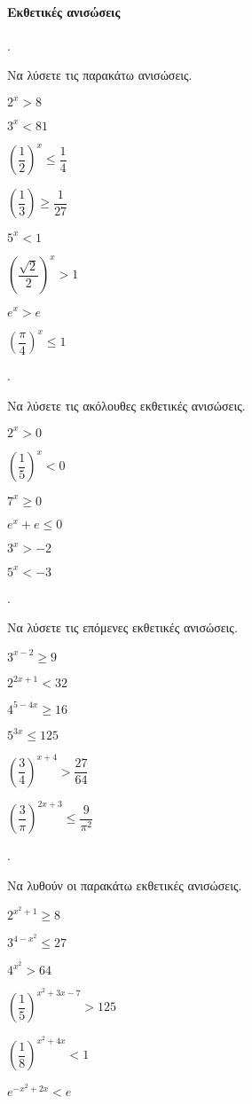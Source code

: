 \documentclass[11pt,a4paper,twocolumn]{article}
\newcounter{askhsh}
\newcommand{\askhsh}{\large\theaskhsh.\ \addtocounter{askhsh}{1}}
\begin{document}
\paragraph{Εκθετικές ανισώσεις}
\askhsh Να λύσετε τις παρακάτω ανισώσεις.
\begin{multicols}{2}
\begin{alist}
\item $2^x>8$
\item $3^x<81$
\item $\left(\dfrac{1}{2}\right)^x\leq\dfrac{1}{4}$
\item $\left(\dfrac{1}{3}\right)\geq\dfrac{1}{27}$
\item $5^x<1$
\item $\left(\dfrac{\sqrt{2}}{2}\right)^x>1$
\item $e^x>e$
\item $\left(\dfrac{\pi}{4}\right)^x\leq 1$
\end{alist}
\end{multicols}
\askhsh Να λύσετε τις ακόλουθες εκθετικές ανισώσεις.
\begin{multicols}{2}
\begin{alist}
\item $2^x>0$
\item $\left(\dfrac{1}{5}\right)^x<0$
\item $7^x\geq 0$
\item $e^x+e\leq 0$
\item $3^x>-2$
\item $5^x<-3$
\end{alist}
\end{multicols}
\askhsh Να λύσετε τις επόμενες εκθετικές ανισώσεις.
\begin{multicols}{2}
\begin{alist}
\item $3^{x-2}\geq 9$
\item $2^{2x+1}<32$
\item $4^{5-4x}\geq 16$
\item $5^{3x}\leq 125$
\item $\left(\dfrac{3}{4}\right)^{x+4}>\dfrac{27}{64}$
\item $\left(\dfrac{3}{\pi}\right)^{2x+3}\leq \dfrac{9}{\pi^2}$
\end{alist}
\end{multicols}
\askhsh Να λυθούν οι παρακάτω εκθετικές ανισώσεις.
\begin{multicols}{2}
\begin{alist}
\item $2^{x^2+1}\geq 8$
\item $3^{4-x^2}\leq 27$
\item $4^{x^2}>64$
\item $\left(\dfrac{1}{5}\right)^{x^2+3x-7}>125$
\item $\left(\dfrac{1}{8}\right)^{x^2+4x}<1$
\item $e^{-x^2+2x}<e$
\end{alist}
\end{multicols}
\end{document}
